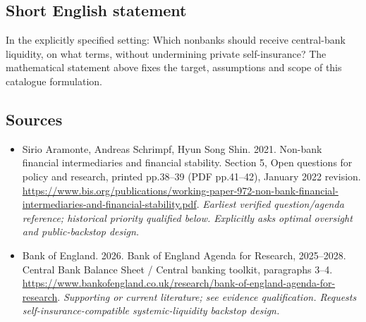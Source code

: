 \documentclass[11pt]{article}
\begin{document}
\subsection{Short English statement}
In the explicitly specified setting: Which nonbanks should receive central-bank liquidity, on what terms, without undermining private self-insurance? The mathematical statement above fixes the target, assumptions and scope of this catalogue formulation.

\subsection{Sources}
\begin{itemize}\raggedright
\item[\textnormal{[S1]}]\hypertarget{source:30007608:1}{} Sirio Aramonte, Andreas Schrimpf, Hyun Song Shin. 2021. Non-bank financial intermediaries and financial stability. Section 5, Open questions for policy and research, printed pp.38–39 (PDF pp.41–42), January 2022 revision.
\url{https://www.bis.org/publications/working-paper-972-non-bank-financial-intermediaries-and-financial-stability.pdf}.
{\small\textit{Earliest verified question/agenda reference; historical priority qualified below. Explicitly asks optimal oversight and public-backstop design.}}

\item[\textnormal{[S2]}]\hypertarget{source:30007608:2}{} Bank of England. 2026. Bank of England Agenda for Research, 2025–2028. Central Bank Balance Sheet / Central banking toolkit, paragraphs 3–4.
\url{https://www.bankofengland.co.uk/research/bank-of-england-agenda-for-research}.
{\small\textit{Supporting or current literature; see evidence qualification. Requests self-insurance-compatible systemic-liquidity backstop design.}}
\end{itemize}
\end{document}
